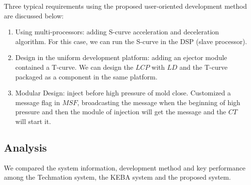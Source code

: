 \documentclass[journal,UTF8]{IEEEtran}
\begin{document}
Three typical requirements using the proposed user-oriented development method are discussed below:
\begin{enumerate}
	\item Using multi-processors: adding S-curve acceleration and deceleration algorithm. For this case, we can run the S-curve in the DSP (slave processor).
	\item Design in the uniform development platform: adding an ejector module contained a T-curve. We can design the $LCP$ with $LD$ and the T-curve packaged as a component in the same platform.
	\item Modular Design: inject before high pressure of mold close. Customized a message flag in $MSF$, broadcasting the message when the beginning of high pressure and then the module of injection will get the message and the $CT$ will start it.
\end{enumerate}
\subsection{Analysis}
We compared the system information, development method and key performance among the Techmation system, the KEBA system and the proposed system.
\end{document}
